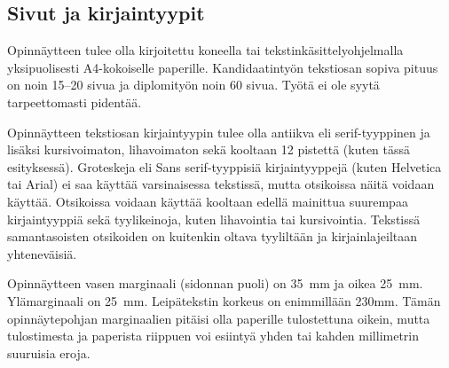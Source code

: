 \documentclass[english, 12pt, a4paper, elec, utf8, a-1b, online]{aaltothesis}
\begin{document}
\subsection*{Sivut ja kirjaintyypit}

Opinn\"aytteen tulee olla kirjoitettu koneella tai
tekstink\"asittelyohjelmalla yksipuolisesti A4-kokoiselle paperille.
Kandidaatinty\"on tekstiosan sopiva pituus on noin 15--20 sivua ja
diplomity\"on noin 60 sivua. Ty\"ot\"a ei ole syyt\"a tarpeettomasti pident\"a\"a.

Opinn\"aytteen tekstiosan kirjaintyypin tulee olla antiikva eli
serif\--tyyp\-pi\-nen ja lis\"aksi kursivoimaton, lihavoimaton sek\"a kooltaan 12
pistett\"a (kuten t\"ass\"a esityksess\"a). Groteskeja eli \textsf{Sans
  serif}-tyyppisi\"a kirjaintyyppej\"a (kuten Helvetica tai Arial) ei saa
k\"aytt\"a\"a varsinaisessa tekstiss\"a, mutta otsikoissa n\"ait\"a voidaan
k\"aytt\"a\"a.  Otsikoissa voidaan k\"aytt\"a\"a kooltaan edell\"a mainittua
suurempaa kirjaintyyppi\"a sek\"a tyylikeinoja, kuten lihavointia tai
kursivointia.  Tekstiss\"a samantasoisten otsikoiden on kuitenkin oltava
tyylilt\"a\"an ja kirjainlajeiltaan yhtenev\"aisi\"a.
\begin{table}[htb]
\caption{Taulukoissa ja kuvissa kirjaintyypin voi valita
tarkoituksenmukaisesti, mutta kuva- ja taulukkoteksteiss\"a tulee
k\"aytt\"a\"a samaa kirjaintyyppi\"a kuin varsinaisessa tekstiss\"a. 
Huomaa taulukon numeroinnin sijoittuminen taulukon yl\"apuolelle. \label{taulukko1}}
\begin{center}
\end{center}
\end{table}

Opinn\"aytteen vasen marginaali (sidonnan puoli) on
35~mm %
ja oikea 25~mm. Yl\"amarginaali on 25~mm. Leip\"atekstin korkeus on
enimmill\"a\"an 230mm. T\"am\"an opinn\"aytepohjan marginaalien pit\"aisi olla
paperille tulostettuna oikein, mutta tulostimesta ja paperista
riippuen voi esiinty\"a yhden tai kahden millimetrin suuruisia eroja.
\end{document}

